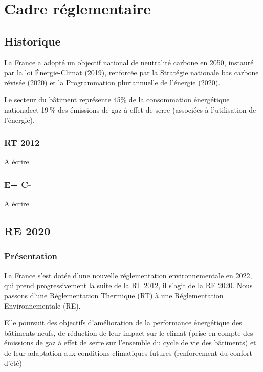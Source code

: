 \part{Cadre réglementaire}

\chapter{Historique}
La France a adopté un objectif national de neutralité carbone en 2050, instauré par la loi Énergie-Climat (2019), renforcée par la Stratégie nationale bas carbone révisée (2020) et la Programmation pluriannuelle de l'énergie (2020).

Le secteur du bâtiment représente 45\% de la consommation énergétique nationaleet 19\,\% des émissions de gaz à effet de serre (associées à l'utilisation de l'énergie).

\section{RT 2012}
A écrire
\section{E+ C-}
A écrire

\chapter{RE 2020}
\label{chap:re2020}

\section{Présentation}
La France s'est dotée d'une nouvelle réglementation environnementale en 2022, qui prend progressivement la suite de la RT 2012, il s'agit de la RE 2020.
Nous passons d'une Réglementation Thermique (RT) à une Réglementation Environnementale (RE).

Elle poursuit des objectifs d'amélioration de la performance énergétique des bâtiments neufs, de réduction de leur impact sur le climat (prise en compte des émissions de gaz à effet de serre sur l'ensemble du cycle de vie des bâtiments) et de leur adaptation aux conditions climatiques futures (renforcement du confort d'été)

